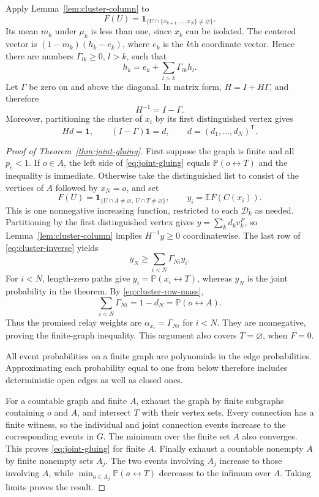Apply Lemma~\ref{lem:cluster-column} to
\[
 F(U)=\mathbf1_{\{U\cap\{x_{k+1},\ldots,x_N\}\ne\varnothing\}}.
\]
Its mean $m_k$ under $\mu_k$ is less than one, since $x_k$ can be
isolated.  The centered vector is $(1-m_k)(h_k-e_k)$, where $e_k$
is the $k$th coordinate vector.  Hence there are numbers
$\Gamma_{lk}\ge0$, $l>k$, such that
\[
 h_k=e_k+\sum_{l>k}\Gamma_{lk}h_l.
\]
Let $\Gamma$ be zero on and above the diagonal.  In matrix form,
$H=I+H\Gamma$, and therefore
\begin{equation}
\label{eq:cluster-inverse}
 H^{-1}=I-\Gamma.
\end{equation}
Moreover, partitioning the cluster of $x_i$ by its first distinguished
vertex gives
\begin{equation}
\label{eq:cluster-row-mass}
 Hd=\mathbf1,\qquad (I-\Gamma)\mathbf1=d,
 \qquad d=(d_1,\ldots,d_N)^{\mathsf T}.
\end{equation}

\begin{proof}[Proof of Theorem~\ref{thm:joint-gluing}]
First suppose the graph is finite and all $p_e<1$.
If $o\in A$, the left side of \eqref{eq:joint-gluing} equals
$\mathbb P(o\leftrightarrow T)$ and the inequality is immediate.
Otherwise take the distinguished list to consist of the vertices of
$A$ followed by $x_N=o$, and set
\[
 F(U)=\mathbf1_{\{U\cap A\ne\varnothing,\ U\cap T\ne\varnothing\}},
 \qquad y_i=\mathbb E F(C(x_i)).
\]
This is one nonnegative increasing function, restricted to each
$\mathcal D_k$ as needed.  Partitioning by the first distinguished
vertex gives $y=\sum_k d_kv_k^F$, so
Lemma~\ref{lem:cluster-column} implies $H^{-1}y\ge0$ coordinatewise.
The last row of \eqref{eq:cluster-inverse} yields
\[
 y_N\ge\sum_{i<N}\Gamma_{Ni}y_i.
\]
For $i<N$, length-zero paths give $y_i=\mathbb P(x_i\leftrightarrow T)$,
whereas $y_N$ is the joint probability in the theorem.  By
\eqref{eq:cluster-row-mass},
\[
 \sum_{i<N}\Gamma_{Ni}=1-d_N=\mathbb P(o\leftrightarrow A).
\]
Thus the promised relay weights are $\alpha_{x_i}=\Gamma_{Ni}$ for $i<N$.
They are nonnegative, proving the finite-graph inequality.
This argument also covers $T=\varnothing$, when $F=0$.

All event probabilities on a finite graph are polynomials in the edge
probabilities.  Approximating each probability equal to one from below
therefore includes deterministic open edges as well as closed ones.

For a countable graph and finite $A$, exhaust the graph by finite
subgraphs containing $o$ and $A$, and intersect $T$ with their vertex
sets.  Every connection has a finite witness, so the individual and
joint connection events increase to the corresponding events in $G$.
The minimum over the finite set $A$ also converges.  This proves
\eqref{eq:joint-gluing} for finite $A$.  Finally exhaust a countable
nonempty $A$ by finite nonempty sets $A_j$.  The two events involving
$A_j$ increase to those involving $A$, while
$\min_{a\in A_j}\mathbb P(a\leftrightarrow T)$ decreases to the infimum
over $A$.  Taking limits proves the result.
\end{proof}

